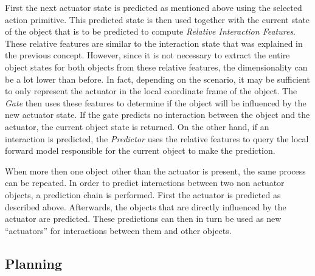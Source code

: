 First the next actuator state is predicted as mentioned above using the selected action primitive.
This predicted state is then used together with the current state of the object that is to be predicted to compute \textit{Relative Interaction Features}. These relative features are similar to the interaction state that was explained in the previous concept. However, since it is not necessary to extract the entire object states for both objects from these relative features, the dimensionality can be a lot lower than before. In fact, depending on the scenario, it may be sufficient to only represent the actuator in the local coordinate frame of the object. 
The \textit{Gate} then uses these features to determine if the object will be influenced by the new actuator state. If the gate predicts no interaction between the object and the actuator, the current object state is returned. 
On the other hand, if an interaction is predicted, the \textit{Predictor} uses the relative features to query the local forward model responsible for the current object to make the prediction. 


When more then one object other than the actuator is present, the same process can be repeated. In order to predict interactions between two non actuator objects, a prediction chain is performed. First the actuator is predicted as described above. Afterwards, the objects that are directly influenced by the actuator are predicted. These predictions can then in turn be used as new \enquote{actuators} for interactions between them and other objects. 


\subsection{Planning}

